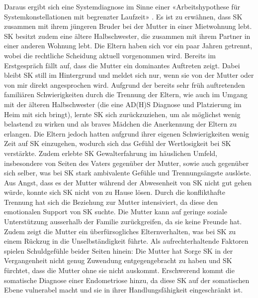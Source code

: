 Daraus ergibt sich eine Systemdiagnose im Sinne einer «Arbeitshypothese für Systemkonstellationen mit begrenzter Laufzeit» \cite{Spitzcok1999}. Es ist zu erwähnen, dass SK zusammen mit ihrem jüngeren Bruder bei der Mutter in einer Mietwohnung lebt. SK besitzt zudem eine ältere Halbschwester, die zusammen mit ihrem Partner in einer anderen Wohnung lebt. Die Eltern haben sich vor ein paar Jahren getrennt, wobei die rechtliche Scheidung aktuell vorgenommen wird. Bereits im Erstgespräch fällt auf, dass die Mutter ein dominantes Auftreten zeigt. Dabei bleibt SK still im Hintergrund und meldet sich nur, wenn sie von der Mutter oder von mir direkt angesprochen wird. Aufgrund der bereits sehr früh auftretenden familiären Schwierigkeiten durch die Trennung der Eltern, wie auch im Umgang mit der älteren Halbschwester (die eine AD(H)S Diagnose und Platzierung im Heim mit sich bringt), lernte SK sich zurückzuziehen, um als möglichst wenig belastend zu wirken und als braves Mädchen die Anerkennung der Eltern zu erlangen. Die Eltern jedoch hatten aufgrund ihrer eigenen Schwierigkeiten wenig Zeit auf SK einzugehen, wodurch sich das Gefühl der Wertlosigkeit bei SK verstärkte. Zudem erlebte SK Gewalterfahrung im häuslichen Umfeld, insbesondere von Seiten des Vaters gegenüber der Mutter, sowie auch gegenüber sich selber, was bei SK stark ambivalente Gefühle und Trennungsängste auslöste. Aus Angst, dass es der Mutter während der Abwesenheit von SK nicht gut gehen würde, konnte sich SK nicht von zu Hause lösen. Durch die konflikthafte Trennung hat sich die Beziehung zur Mutter intensiviert, da diese den emotionalen Support von SK suchte. Die Mutter kann auf geringe soziale Unterstützung ausserhalb der Familie zurückgreifen, da sie keine Freunde hat. Zudem zeigt die Mutter ein überfürsogliches Elternverhalten, was bei SK zu einem Rückzug in die Unselbständigkeit führte. Als aufrechterhaltende Faktoren spielen Schuldgefühle beider Seiten hinein: Die Mutter hat Sorge SK in der Vergangenheit nicht genug Zuwendung entgegengebracht zu haben und SK fürchtet, dass die Mutter ohne sie nicht auskommt. Erschwerend kommt die somatische Diagnose einer Endometriose hinzu, da diese SK auf der somatischen Ebene vulnerabel macht und sie in ihrer Handlungsfähigkeit eingeschränkt ist. 

